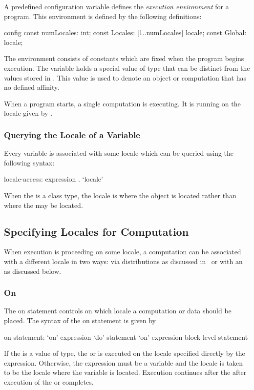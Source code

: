 A predefined configuration variable defines the {\em execution
environment} for a program.  This environment is defined by the
following definitions:
\begin{chapel}
config const numLocales: int;
const Locales: [1..numLocales] locale;
const Global: locale;
\end{chapel}
The environment consists of constants which are fixed when the program
begins execution.  The variable  holds a special value
of  type that can be distinct from the values stored
in . This value is used to denote an object or
computation that has no defined affinity.

When a program starts, a single computation is executing.  It is
running on the locale given by .

\subsubsection{Querying the Locale of a Variable}
\label{Querying_the_Locale_of_a_Variable}

Every variable  is associated with some locale which can be
queried using the following syntax:
\begin{syntax}
locale-access:
  expression . `locale'
\end{syntax}
When the  is a class type, the locale is where the
object is located rather than where the  may be
located.

\subsection{Specifying Locales for Computation}
\label{Specifying_Locales_for_Computation}

When execution is proceeding on some locale, a computation can be
associated with a different locale in two ways: via distributions as
discussed in~ or with an  as
discussed below.

\subsubsection{On}
\label{On}

The on statement controls on which locale a computation or data should
be placed.  The syntax of the on statement is given by
\begin{syntax}
on-statement:
  `on' expression `do' statement
  `on' expression block-level-statement
\end{syntax}
If the  is a value of  type,
the  or  is executed on
the locale specified directly by the expression.  Otherwise, the
expression must be a variable and the locale is taken to be the locale
where the variable is located.  Execution continues after
the  after execution of the 
or  completes.

